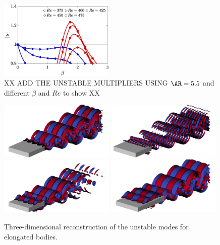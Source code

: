 \begin{figure}
  \includegraphics[width=0.49\textwidth]{./fig/AR9s/multipliers.eps}
  \caption{XX ADD THE UNSTABLE MULTIPLIERS USING $\AR=5.5$ and different $\beta$ and $Re$ to show XX}
  \label{fig:multipliers_long}
\end{figure}

\begin{figure}
  \centering
  \includegraphics[width=0.49\textwidth]{./fig/AR5s/Floqetmode_beta_2_Re550_AR5p5_A.png}
  \includegraphics[width=0.49\textwidth]{./fig/AR5s/Floqetmode_beta_4p75_Re550_AR5p5_Ap.png}
  \includegraphics[width=0.49\textwidth]{./fig/AR5s/Floqetmode_beta_2_Re550_AR5p5_QS.png}   
  \includegraphics[width=0.49\textwidth]{./fig/AR9s/Floquet_AR9_Re450_beta2_modeQS.png}
  \caption{Three-dimensional reconstruction of the unstable modes for elongated bodies.}
  \label{fig:modes_long}
\end{figure}

